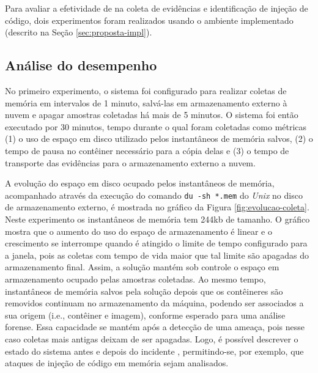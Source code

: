Para avaliar a efetividade de \fancyname na coleta de evidências e identificação de injeção de código, dois experimentos foram realizados usando o ambiente implementado (descrito na Seção \ref{sec:proposta-impl}).
%


\subsection{Análise do desempenho}
\label{sec:proposta-exp-desempenho}

No primeiro experimento, o sistema foi configurado para realizar coletas de memória em intervalos de 1 minuto, salvá-las em armazenamento externo à nuvem e apagar amostras coletadas há mais de 5 minutos. 
%
O sistema foi então executado por 30 minutos, tempo durante o qual foram coletadas como métricas (1) o uso de espaço em disco utilizado pelos instantâneos de memória salvos, (2) o tempo de pausa no contêiner necessário para a cópia delas e (3) o tempo de transporte das evidências para o armazenamento externo a nuvem.


A evolução do espaço em disco ocupado pelos instantâneos de memória, acompanhado através da execução do comando \texttt{du -sh *.mem} do \textit{Unix} no disco de armazenamento externo, é mostrada no gráfico da Figura \ref{fig:evolucao-coleta}.
%
Neste experimento os instantâneos de memória tem 244kb de tamanho. 
%
O gráfico mostra que o aumento do uso do espaço de armazenamento é linear e o crescimento se interrompe quando é atingido o limite de tempo configurado para a janela, pois as coletas com tempo de vida maior que tal limite são apagadas do armazenamento final. 
%
Assim, a solução mantém sob controle o espaço em armazenamento ocupado pelas amostras coletadas.
%
Ao mesmo tempo, instantâneos de memória salvos pela solução depois que os contêineres são removidos continuam no armazenamento da máquina, podendo ser associados a sua origem (i.e., contêiner e imagem), conforme esperado para uma análise forense.
%
Essa capacidade se mantém após a detecção de uma ameaça, pois nesse caso coletas mais antigas deixam de ser apagadas.
%
Logo, é possível descrever o estado do sistema antes e depois do incidente \cite{CaseMemoryForensics:2014}, permitindo-se, por exemplo, que ataques de injeção de código em memória sejam analisados.



